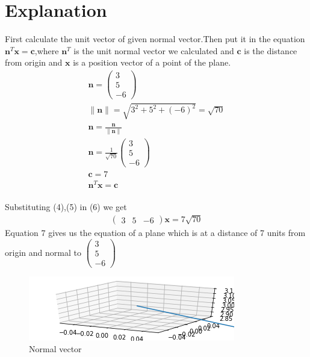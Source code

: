 \documentclass[journal,12pt,twocolumn]{IEEEtran}
\newcommand{\norm}[1]{\| #1 \|}
\begin{document}
\section{Explanation}
First calculate the unit vector of given normal vector.Then put it in the equation $\mathbf{n}^T\mathbf{x} = \bm{c}$,where $\mathbf{n}^T$ is the unit normal vector we calculated and $\bm{c}$ is the distance from origin and $\mathbf{x}$ is a position vector of a point of the plane.
\vspace{2mm}
\begin{align}
    \mathbf{n}=\begin{pmatrix}3\\5\\-6\end{pmatrix}\\
    \norm{\mathbf{n}}=\sqrt{3^2+5^2+(-6)^2}=\sqrt{70}\\
    \mathbf{n}=\frac{\mathbf{n}}{\norm{\mathbf{n}}}\\
    \mathbf{n}=\frac{1}{\sqrt{70}}\begin{pmatrix}3\\5\\-6\end{pmatrix}\\
    \bm{c}=7\\
    \mathbf{n}^T\mathbf{x} =\bm{c}
\end{align}
\vspace{2mm}\\
Substituting (4),(5) in (6) we get\\
\begin{align}
    \boxed{\begin{pmatrix}3 & 5 & -6\end{pmatrix}\mathbf{x}}=7\sqrt{70}
\end{align}
Equation 7 gives us the equation of a plane which is at a distance of 7 units from origin and normal to $\begin{pmatrix}3\\5\\-6\end{pmatrix}$
\begin{figure}[h!]
	\centering
	\includegraphics[width=\columnwidth]{vector.png}
	\caption{Normal vector}
	\label{myfig1}
\end{figure}
\end{document}
